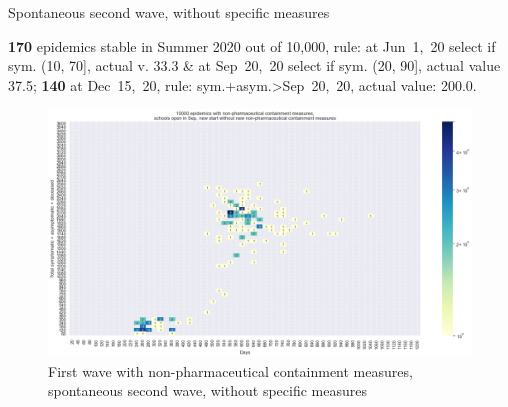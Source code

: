 \documentclass[8pt]{beamer}
\begin{document}
\begin{frame}{Spontaneous second wave, without specific measures}


\textbf{170} {\tiny epidemics stable in Summer 2020 out of 10,000, rule: at Jun~1,~20 select if sym. (10, 70], actual v. 33.3 \& at Sep~20,~20 select if sym. (20, 90], actual value 37.5;} \textbf{140} {\tiny at Dec~15,~20, rule: sym.+asym.>Sep~20,~20, actual value: 200.0.}

\begin{figure}[H]
\center
\includegraphics[scale=0.17]{10kSpontWave2.png}
\caption{First wave with non-pharmaceutical containment measures, spontaneous second wave, without specific measures}
\label{selSpontWave2}
\end{figure}



\end{frame}
\end{document}
